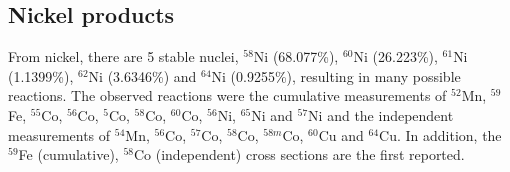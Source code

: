 

\subsection{Nickel products}
From nickel, there are 5 stable nuclei, $^{58}$Ni (68.077\%), $^{60}$Ni (26.223\%), $^{61}$Ni (1.1399\%), $^{62}$Ni (3.6346\%) and $^{64}$Ni (0.9255\%), resulting in many possible reactions. The observed reactions were the cumulative measurements of $^{52}$Mn, $^{59}$Fe, $^{55}$Co, $^{56}$Co, $^{5}$Co, $^{58}$Co, $^{60}$Co, $^{56}$Ni, $^{65}$Ni and $^{57}$Ni and the independent measurements of $^{54}$Mn, $^{56}$Co, $^{57}$Co, $^{58}$Co, $^{58m}$Co, $^{60}$Cu and $^{64}$Cu. In addition, the $^{59}$Fe (cumulative), $^{58}$Co (independent) cross sections are the first reported.\\





